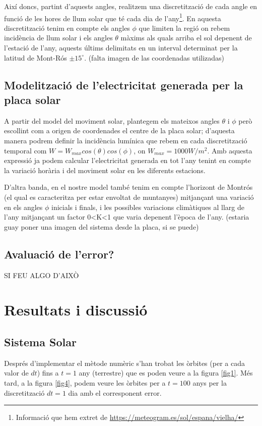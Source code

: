 \documentclass[10pt, twoside, a4paper]{article}
\begin{document}
Així doncs, partint d'aquests angles, realitzem una discretització de cada angle en funció de les hores de llum solar que té cada dia de l'any\footnote{Informació que hem extret de \url{https://meteogram.es/sol/espana/vielha/}}. En aquesta discretització tenim en compte els angles $\phi$ que limiten la regió on rebem incidència de llum solar i els angles $\theta$ màxims als quals arriba el sol depenent de l'estació de l'any, aquests últims delimitats en un interval determinat per la latitud de Mont-Rós $\pm 15^\circ$.
(falta imagen de las coordenadas utilizadas)
\subsection{Modelització de l'electricitat generada per la placa solar}
A partir del model del moviment solar, plantegem els mateixos angles $\theta$ i $\phi$ però escollint com a origen de coordenades el centre de la placa solar; d'aquesta manera podrem definir la incidència lumínica que rebem en cada discretització temporal com $W = W_{max}cos(\theta)cos(\phi)$, on $W_{max} = 1000 W/m^2$. Amb aquesta expressió ja podem calcular l'electricitat generada en tot l'any tenint en compte la variació horària i del moviment solar en les diferents estacions.

D'altra banda, en el nostre model també tenim en compte l'horizont de Montrós (el qual es caracteritza per estar envoltat de muntanyes) mitjançant una variació en els angles $\phi$ inicials i finals, i les possibles variacions climàtiques al llarg de l'any mitjançant un factor 0<K<1 que varia depenent l'època de l'any.
(estaria guay poner una imagen del sistema desde la placa, si se puede)
\subsection{Avaluació de l'error?}
SI FEU ALGO D'AIXÒ

\section{Resultats i discussió}

\subsection{Sistema Solar}
Després d'implementar el mètode numèric s'han trobat les òrbites (per a cada valor de $dt$) fins a $t=1$ any (terrestre) que es poden veure a la figura \ref{fig1}. Més tard, a la figura \ref{fig4}, podem veure les òrbites per a $t=100$ anys per la discretització $dt=1$ dia amb el corresponent error.
 
\end{document}
